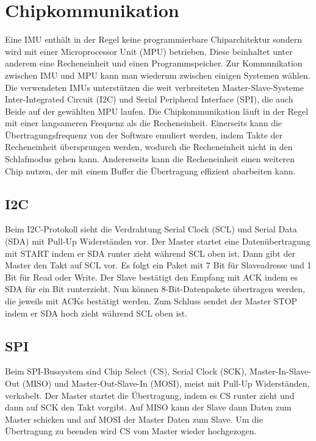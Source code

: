 \section{Chipkommunikation}
Eine IMU enthält in der Regel keine programmierbare Chiparchitektur sondern wird mit einer Microprocessor Unit (MPU) betrieben.
Diese beinhaltet unter anderem eine Recheneinheit und einen Programmspeicher.
Zur Kommunikation zwischen IMU und MPU kann man wiederum zwischen einigen Systemen wählen.
Die verwendeten IMUs unterstützen die weit verbreiteten Master-Slave-Systeme Inter-Integrated Circuit (I2C) und Serial Peripheral Interface (SPI), die auch Beide auf der gewählten MPU laufen.
Die Chipkommunikation läuft in der Regel mit einer langsameren Frequenz als die Recheneinheit.
Einerseits kann die Übertragungsfrequenz von der Software emuliert werden, indem Takte der Recheneinheit übersprungen werden, wodurch die Recheneinheit nicht in den Schlafmodus gehen kann.
Andererseits kann die Recheneinheit einen weiteren Chip nutzen, der mit einem Buffer die Übertragung effizient abarbeiten kann.

\subsection{I2C}
Beim I2C-Protokoll sieht die Verdrahtung Serial Clock (SCL) und Serial Data (SDA) mit Pull-Up Widerständen vor.
Der Master startet eine Datenübertragung mit START indem er SDA runter zieht während SCL oben ist.
Dann gibt der Master den Takt auf SCL vor.
Es folgt ein Paket mit 7 Bit für Slaveadresse und 1 Bit für Read oder Write.
Der Slave bestätigt den Empfang mit ACK indem es SDA für ein Bit runterzieht.
Nun können 8-Bit-Datenpakete übertragen werden, die jeweils mit ACKs bestätigt werden.
Zum Schluss sendet der Master STOP indem er SDA hoch zieht während SCL oben ist. \cite{manual_i2c}

\subsection{SPI}
Beim SPI-Bussystem sind Chip Select (CS), Serial Clock (SCK), Master-In-Slave-Out (MISO) und Master-Out-Slave-In (MOSI), meist mit Pull-Up Widerständen, verkabelt.
Der Master startet die Übertragung, indem es CS runter zieht und dann auf SCK den Takt vorgibt.
Auf MISO kann der Slave dann Daten zum Master schicken und auf MOSI der Master Daten zum Slave.
Um die Übertragung zu beenden wird CS vom Master wieder hochgezogen. \cite{site_micSpi}

